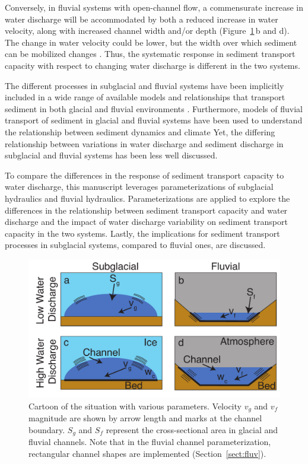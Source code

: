 \documentclass[11pt]{article}
\begin{document}
\begin{spacing}{1}
  Conversely, in fluvial systems with open-channel flow, a commensurate increase in water discharge will be accommodated by both a reduced increase in water velocity, along with increased channel width and/or depth (Figure~\ref{fig:cartoon}\,b and d).
  The change in water velocity could be lower, but the width over which sediment can be mobilized changes \citep{leopold1953}.
  Thus, the systematic response in sediment transport capacity with respect to changing water discharge is  different in the two systems.
  
  The different processes in subglacial and fluvial systems have been implicitly included in a wide range of available models and relationships that transport sediment in both glacial and fluvial environments \citep[e.g.][]{walder1994,tucker1997,beaud2018,wickert2019}.
  Furthermore, models of fluvial transport of sediment in glacial and fluvial systems have been used to understand the relationship between sediment dynamics and climate \citep[e.g.][]{tucker1997,delaney2020}
  Yet, the differing relationship between variations in water discharge and sediment discharge in subglacial and fluvial systems has been less well discussed.
  
  To compare the differences in the response of sediment transport capacity to water discharge, this manuscript leverages parameterizations of subglacial hydraulics and fluvial hydraulics.
  Parameterizations are applied to explore the differences in the relationship between sediment transport capacity and water discharge and the impact of water discharge variability on sediment transport capacity in the two systems.
  Lastly, the implications for sediment transport processes in subglacial systems, compared to fluvial ones, are discussed.
  
  \begin{center}
    \begin{figure}[H]
      \includegraphics[width=0.9\linewidth]{Cartoon.pdf}
      \caption{Cartoon of the situation with various parameters. Velocity $v_g$ and $v_f$ magnitude are shown by arrow length and marks at the channel boundary. $S_g$ and $S_f$ represent the cross-sectional area in glacial and fluvial channels.  Note that in the fluvial channel parameterization, rectangular channel shapes are implemented (Section~\ref{sect:fluv}).} 
      \label{fig:cartoon}
    \end{figure}
  \end{center}
  

\end{spacing}
\end{document}
